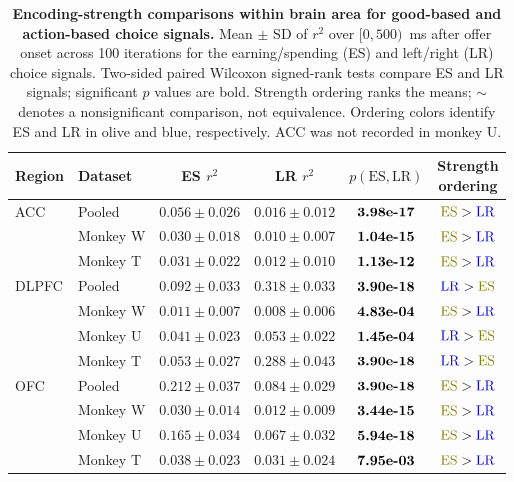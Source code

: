 \documentclass[pdflatex,sn-mathphys-num]{sn-jnl}%
\newcommand{\ESc}{\textcolor{choiceES}{\mathrm{ES}}}
\newcommand{\LRc}{\textcolor{choiceLR}{\mathrm{LR}}}
\begin{document}
\clearpage
\begin{table}[p]\centering
\caption{\textbf{Encoding-strength comparisons within brain area for good-based and action-based choice signals.} Mean $\pm$ SD of $r^2$ over $[0,500)$~ms after offer onset across 100 iterations for the earning/spending (ES) and left/right (LR) choice signals. Two-sided paired Wilcoxon signed-rank tests compare ES and LR signals; significant $p$ values are bold. Strength ordering ranks the means; $\sim$ denotes a nonsignificant comparison, not equivalence. Ordering colors identify ES and LR in olive and blue, respectively. ACC was not recorded in monkey U.}
\label{tab:supp_choice_strength}
\begingroup\fontsize{7}{8.5}\selectfont\setlength{\tabcolsep}{1.5pt}
\begin{tabular*}{\textwidth}{@{\extracolsep{\fill}}llcccc@{}}\toprule
Region & Dataset & ES $r^2$ & LR $r^2$ & $p(\mathrm{ES},\mathrm{LR})$ & \shortstack{Strength\\ordering}\\\midrule
ACC & Pooled & $0.056\pm0.026$ & $0.016\pm0.012$ & $\text{\bfseries \mbox{3.98e-17}}$ & $\ESc > \LRc$ \\
  & Monkey W & $0.030\pm0.018$ & $0.010\pm0.007$ & $\text{\bfseries \mbox{1.04e-15}}$ & $\ESc > \LRc$ \\
  & Monkey T & $0.031\pm0.022$ & $0.012\pm0.010$ & $\text{\bfseries \mbox{1.13e-12}}$ & $\ESc > \LRc$ \\
\midrule
DLPFC & Pooled & $0.092\pm0.033$ & $0.318\pm0.033$ & $\text{\bfseries \mbox{3.90e-18}}$ & $\LRc > \ESc$ \\
  & Monkey W & $0.011\pm0.007$ & $0.008\pm0.006$ & $\text{\bfseries \mbox{4.83e-04}}$ & $\ESc > \LRc$ \\
  & Monkey U & $0.041\pm0.023$ & $0.053\pm0.022$ & $\text{\bfseries \mbox{1.45e-04}}$ & $\LRc > \ESc$ \\
  & Monkey T & $0.053\pm0.027$ & $0.288\pm0.043$ & $\text{\bfseries \mbox{3.90e-18}}$ & $\LRc > \ESc$ \\
\midrule
OFC & Pooled & $0.212\pm0.037$ & $0.084\pm0.029$ & $\text{\bfseries \mbox{3.90e-18}}$ & $\ESc > \LRc$ \\
  & Monkey W & $0.030\pm0.014$ & $0.012\pm0.009$ & $\text{\bfseries \mbox{3.44e-15}}$ & $\ESc > \LRc$ \\
  & Monkey U & $0.165\pm0.034$ & $0.067\pm0.032$ & $\text{\bfseries \mbox{5.94e-18}}$ & $\ESc > \LRc$ \\
  & Monkey T & $0.038\pm0.023$ & $0.031\pm0.024$ & $\text{\bfseries \mbox{7.95e-03}}$ & $\ESc > \LRc$ \\
\bottomrule\end{tabular*}\endgroup
\end{table}
\end{document}
